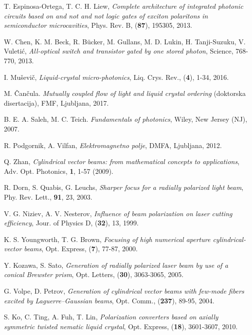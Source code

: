 \documentclass[longbibliography,slovene,a4paper,12pt]{book}
\begin{document}
\begin{thebibliography}{15}
	T. Espinosa-Ortega, T. C. H. Liew,
	\emph{Complete architecture of integrated photonic circuits based on and not and not logic gates of exciton polaritons in semiconductor microcavities},
	Phys. Rev. B, (\textbf{87}), 195305, 2013.

	W. Chen, K. M. Beck, R. Bücker, M. Gullans, M. D. Lukin, H. Tanji-Suzuku, V. Vuletić,
	\emph{All-optical switch and transistor gated by one stored photon},
	Science, 768-770, 2013.
	
	I. Muševič,
	\emph{Liquid-crystal micro-photonics},
	Liq. Crys. Rev., (\textbf{4}), 1-34, 2016.

	M. Čančula.
	\emph{Mutually coupled flow of light and liquid crystal ordering} (doktorska disertacija),
	FMF, Ljubljana, 2017.
	
	B. E. A. Saleh, M. C. Teich.
	\emph{Fundamentals of photonics},
	Wiley, New Jersey (NJ), 2007.
	
	R. Podgornik, A. Vilfan,
	\emph{Elektromagnetno polje},
	DMFA, Ljubljana, 2012.



	Q. Zhan,
	\emph{Cylindrical vector beams: from mathematical concepts to applications},
	Adv. Opt. Photonics, \textbf{1}, 1-57 (2009).

	R. Dorn, S. Quabis, G. Leuchs,
	\emph{Sharper focus for a radially polarized light beam},
	Phy. Rev. Lett., \textbf{91}, 23, 2003.
	
	V. G. Niziev, A. V. Nesterov,
	\emph{Influence of beam polarization on laser cutting efficiency},
	Jour. of Physics D, (\textbf{32}), 13, 1999.

	K. S. Youngworth, T. G. Brown,
	\emph{Focusing of high numerical aperture cylindrical-vector beams},
	Opt. Express, (\textbf{7}), 77-87, 2000.
	
	Y. Kozawa, S. Sato,
	\emph{Generation of radially polarized laser beam by use of a conical Brewster prism},
	Opt. Letters, (\textbf{30}), 3063-3065, 2005.

	G. Volpe, D. Petrov,
	\emph{Generation of cylindrical vector beams with few-mode fibers excited by Laguerre–Gaussian beams},
	Opt. Comm., (\textbf{237}), 89-95, 2004.
	
	S. Ko, C. Ting, A. Fuh, T. Lin,
	\emph{Polarization converters based on axially symmetric twisted nematic liquid crystal},
	Opt. Express, (\textbf{18}), 3601-3607, 2010.


\end{thebibliography}
\end{document}

